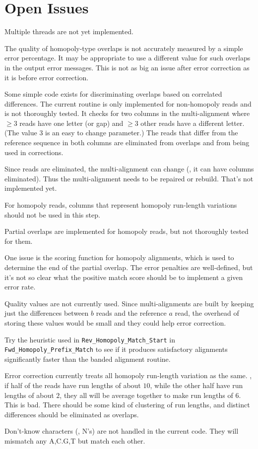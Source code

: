 \documentclass[letterpaper,11pt]{article}
\def\Pgm#1{\texttt{#1}}
\newenvironment{technotes}{\bq\small\bf\bi\exdent{Technical Notes:}}{\ei\eq}
\def\btn{\begin{technotes}}
\def\etn{\end{technotes}}
\begin{document}
\section{Open Issues}

\bn
\item
  Multiple threads are not yet implemented.
\item
  The quality of homopoly-type overlaps is not accurately measured
  by a simple error percentage.  It may be appropriate to use a
  different value for such overlaps in the output error messages.
  This is not as big an issue after error correction as it is before
  error correction.
\item
  Some simple code exists for discriminating overlaps based on
  correlated differences.  The current routine is only implemented for
  non-homopoly reads and is not thoroughly tested.  It checks for
  two columns in the multi-alignment where $\ge 3$ reads have one
  letter (or gap) and $\ge 3$ other reads have a different letter.
  (The value $3$ is an easy to change parameter.)  The reads that differ
  from the reference sequence in both columns are eliminated from
  overlaps and from being used in corrections.
  \btn
  \item
    Since reads are eliminated, the multi-alignment can change (\eg,
    it can have columns eliminated).  Thus the multi-alignment needs
    to be repaired or rebuild.  That's not implemented yet.
  \item
    For homopoly reads, columns that represent homopoly run-length
    variations should not be used in this step.
  \etn
\item
  Partial overlaps are implemented for homopoly reads, but not
  thoroughly tested for them.
  \btn
  \item
    One issue is the scoring function for homopoly alignments, which
    is used to determine the end of the partial overlap.  The error
    penalties are well-defined, but it's not so clear what the positive
    match score should be to implement a given error rate.
  \etn
\item
  Quality values are not currently used.  Since multi-alignments are built
  by keeping just the differences between $b$ reads and the reference
  $a$ read, the overhead of storing these values would be small and
  they could help error correction.
\item
  Try the heuristic used in \Pgm{Rev\_Homopoly\_Match\_Start} in
  \Pgm{Fwd\_Homopoly\_Prefix\_Match} to see if it produces satisfactory
  alignments significantly faster than the banded alignment routine.
\item
  Error correction currently treats all homopoly run-length variation
  as the same.  \Eg, if half of the reads have run lengths of about $10$,
  while the other half have run lengths of about $2$, they all will be
  average together to make run lengths of $6$.  This is bad.  There should
  be some kind of clustering of run lengths, and distinct differences
  should be eliminated as overlaps.
\item
  Don't-know characters (\ie, N's) are not handled in the current code.
  They will mismatch any A,C.G,T but match each other.
\en
\end{document}
